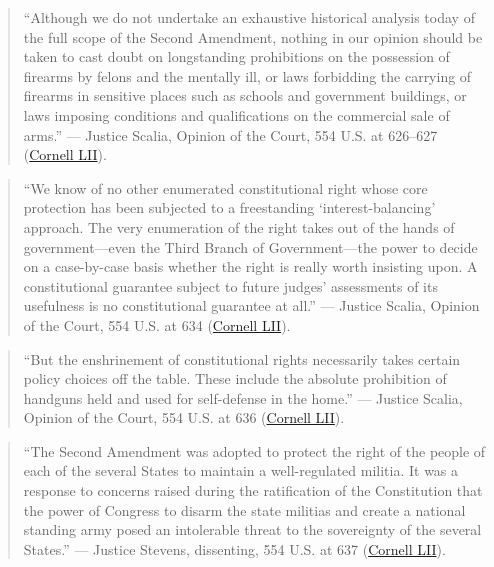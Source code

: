 \documentclass[12pt]{article}
\begin{document}
\begin{quote}
``Although we do not undertake an exhaustive historical analysis today of the full scope of the Second Amendment, nothing in our opinion should be taken to cast doubt on longstanding prohibitions on the possession of firearms by felons and the mentally ill, or laws forbidding the carrying of firearms in sensitive places such as schools and government buildings, or laws imposing conditions and qualifications on the commercial sale of arms.'' --- Justice Scalia, Opinion of the Court, 554 U.S. at 626--627 (\href{https://www.law.cornell.edu/supct/html/07-290.ZO.html}{Cornell LII}).
\end{quote}

\begin{quote}
``We know of no other enumerated constitutional right whose core protection has been subjected to a freestanding `interest-balancing' approach. The very enumeration of the right takes out of the hands of government---even the Third Branch of Government---the power to decide on a case-by-case basis whether the right is really worth insisting upon. A constitutional guarantee subject to future judges' assessments of its usefulness is no constitutional guarantee at all.'' --- Justice Scalia, Opinion of the Court, 554 U.S. at 634 (\href{https://www.law.cornell.edu/supct/html/07-290.ZO.html}{Cornell LII}).
\end{quote}

\begin{quote}
``But the enshrinement of constitutional rights necessarily takes certain policy choices off the table. These include the absolute prohibition of handguns held and used for self-defense in the home.'' --- Justice Scalia, Opinion of the Court, 554 U.S. at 636 (\href{https://www.law.cornell.edu/supct/html/07-290.ZO.html}{Cornell LII}).
\end{quote}

\begin{quote}
``The Second Amendment was adopted to protect the right of the people of each of the several States to maintain a well-regulated militia. It was a response to concerns raised during the ratification of the Constitution that the power of Congress to disarm the state militias and create a national standing army posed an intolerable threat to the sovereignty of the several States.'' --- Justice Stevens, dissenting, 554 U.S. at 637 (\href{https://www.law.cornell.edu/supct/html/07-290.ZD.html}{Cornell LII}).
\end{quote}
\end{document}
